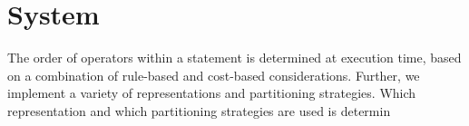 \section{System}
\label{sec:sys}

The order of operators within a \ql statement is determined at
execution time, based on a combination of rule-based and cost-based
considerations.  Further, we implement a variety of \tg
representations and partitioning strategies.  Which representation and
which partitioning strategies are used is determin

